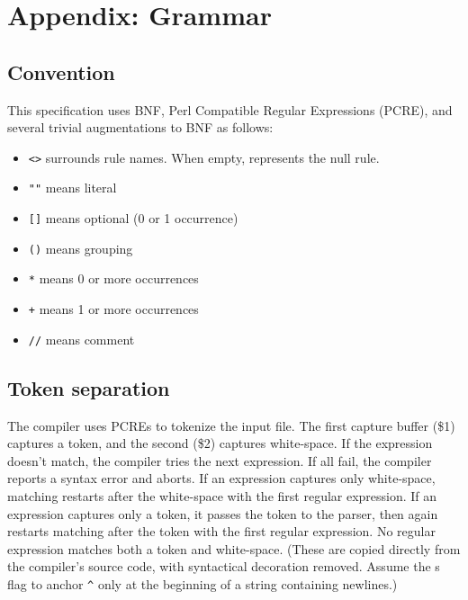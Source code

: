 \section{Appendix:  Grammar}

\subsection{Convention}

This specification uses BNF, Perl Compatible Regular Expressions (PCRE), and several trivial augmentations to BNF as
follows:

\begin{itemize}
\item \verb_<>_ surrounds rule names.  When empty, represents the null rule.
\item \verb_""_ means literal
\item \verb_[]_ means optional (0 or 1 occurrence)
\item \verb_()_ means grouping
\item \verb_*_ means 0 or more occurrences
\item \verb_+_ means 1 or more occurrences
\item \verb_//_ means comment
\end{itemize}

\subsection{Token separation}

The compiler uses PCREs to tokenize the input file.  The first capture buffer (\$1) captures a token, and the second
(\$2) captures white-space.  If the expression doesn't match, the compiler tries the next expression.  If all fail, the
compiler reports a syntax error and aborts.  If an expression captures only white-space, matching restarts after the
white-space with the first regular expression.  If an expression captures only a token, it passes the token to the
parser, then again restarts matching after the token with the first regular expression.  No regular expression matches
both a token and white-space.  (These are copied directly from the compiler's source code, with syntactical decoration
removed.  Assume the s flag to anchor \verb_^_ only at the beginning of a string containing newlines.)

